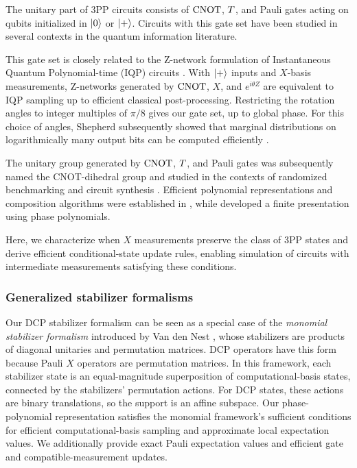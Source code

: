The unitary part of 3PP circuits consists of $\operatorname{CNOT}$, $T$, and Pauli gates acting on qubits initialized in $|0\rangle$ or $|+\rangle$. Circuits with this gate set have been studied in several contexts in the quantum information literature.

This gate set is closely related to the Z-network formulation of Instantaneous Quantum Polynomial-time (IQP) circuits \cite[Section 5]{shepherd2009instantaneous}. With $|+\rangle$ inputs and $X$-basis measurements, Z-networks generated by $\operatorname{CNOT}$, $X$, and $e^{i\theta Z}$ are equivalent to IQP sampling up to efficient classical post-processing. Restricting the rotation angles to integer multiples of $\pi/8$ gives our gate set, up to global phase. For this choice of angles, Shepherd subsequently showed that marginal distributions on logarithmically many output bits can be computed efficiently \cite[Theorem 4]{shepherd2010binary}.

The unitary group generated by $\operatorname{CNOT}$, $T$, and Pauli gates was subsequently named the CNOT-dihedral group and studied in the contexts of randomized benchmarking and circuit synthesis \cite{cross2016scalable, amy2018finite, garion2020synthesis}. Efficient polynomial representations and composition algorithms were established in \cite{cross2016scalable}, while \cite{amy2018finite} developed a finite presentation using phase polynomials.

Here, we characterize when $X$ measurements preserve the class of 3PP states and derive efficient conditional-state update rules, enabling simulation of circuits with intermediate measurements satisfying these conditions.

\subsubsection{Generalized stabilizer formalisms}

Our DCP stabilizer formalism can be seen as a special case of the \textit{monomial stabilizer formalism} introduced by Van den Nest \cite{nest2011monomial}, whose stabilizers are products of diagonal unitaries and permutation matrices. DCP operators have this form because Pauli $X$ operators are permutation matrices. In this framework, each stabilizer state is an equal-magnitude superposition of computational-basis states, connected by the stabilizers' permutation actions. For DCP states, these actions are binary translations, so the support is an affine subspace. Our phase-polynomial representation satisfies the monomial framework's sufficient conditions for efficient computational-basis sampling and approximate local expectation values. We additionally provide exact Pauli expectation values and efficient gate and compatible-measurement updates.

